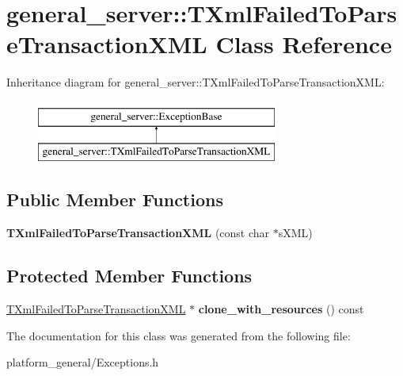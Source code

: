 \hypertarget{classgeneral__server_1_1TXmlFailedToParseTransactionXML}{\section{general\-\_\-server\-:\-:\-T\-Xml\-Failed\-To\-Parse\-Transaction\-X\-M\-L \-Class \-Reference}
\label{classgeneral__server_1_1TXmlFailedToParseTransactionXML}
}
\-Inheritance diagram for general\-\_\-server\-:\-:\-T\-Xml\-Failed\-To\-Parse\-Transaction\-X\-M\-L\-:\begin{figure}[H]
\begin{center}
\leavevmode
\includegraphics[height=2.000000cm]{classgeneral__server_1_1TXmlFailedToParseTransactionXML}
\end{center}
\end{figure}
\subsection*{\-Public \-Member \-Functions}
\begin{DoxyCompactItemize}
\item 
\hypertarget{classgeneral__server_1_1TXmlFailedToParseTransactionXML_a204621a893059c5b8f9678f59bc3131b}{{\bfseries \-T\-Xml\-Failed\-To\-Parse\-Transaction\-X\-M\-L} (const char $\ast$s\-X\-M\-L)}\label{classgeneral__server_1_1TXmlFailedToParseTransactionXML_a204621a893059c5b8f9678f59bc3131b}

\end{DoxyCompactItemize}
\subsection*{\-Protected \-Member \-Functions}
\begin{DoxyCompactItemize}
\item 
\hypertarget{classgeneral__server_1_1TXmlFailedToParseTransactionXML_a5775f4cae7212596d62404a6942e6be4}{\hyperlink{classgeneral__server_1_1TXmlFailedToParseTransactionXML}{\-T\-Xml\-Failed\-To\-Parse\-Transaction\-X\-M\-L} $\ast$ {\bfseries clone\-\_\-with\-\_\-resources} () const }\label{classgeneral__server_1_1TXmlFailedToParseTransactionXML_a5775f4cae7212596d62404a6942e6be4}

\end{DoxyCompactItemize}


\-The documentation for this class was generated from the following file\-:\begin{DoxyCompactItemize}
\item 
platform\-\_\-general/\-Exceptions.\-h\end{DoxyCompactItemize}
